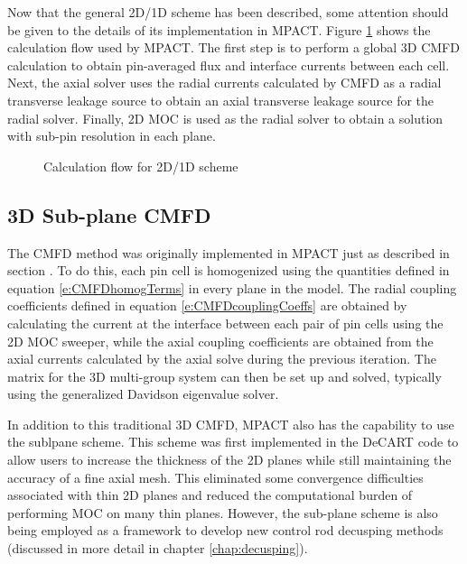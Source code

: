 Now that the general 2D/1D scheme has been described, some attention should be given to the details of its implementation in MPACT.  Figure \ref{f:2d1d-flowchart} shows the calculation flow used by MPACT.  The first step is to perform a global 3D CMFD calculation to obtain pin-averaged flux and interface currents between each cell.  Next, the axial solver uses the radial currents calculated by CMFD as a radial transverse leakage source to obtain an axial transverse leakage source for the radial solver.  Finally, 2D MOC is used as the radial solver to obtain a solution with sub-pin resolution in each plane.

\begin{figure}
\centering

\caption{Calculation flow for 2D/1D scheme}\label{f:2d1d-flowchart}
\end{figure}

\subsection{3D Sub-plane CMFD}

The CMFD method was originally implemented in MPACT just as described in section .  To do this, each pin cell is homogenized using the quantities defined in equation \ref{e:CMFDhomogTerms} in every plane in the model.  The radial coupling coefficients defined in equation \ref{e:CMFDcouplingCoeffs} are obtained by calculating the current at the interface between each pair of pin cells using the 2D MOC sweeper, while the axial coupling coefficients are obtained from the axial currents calculated by the axial solve during the previous iteration.  The matrix for the 3D multi-group system can then be set up and solved, typically using the generalized Davidson eigenvalue solver.

In addition to this traditional 3D CMFD, MPACT also has the capability to use the sublpane scheme.  This scheme was first implemented in the DeCART code to allow users to increase the thickness of the 2D planes while still maintaining the accuracy of a fine axial mesh.  This eliminated some convergence difficulties associated with thin 2D planes  and reduced the computational burden of performing MOC on many thin planes.  However, the sub-plane scheme is also being employed as a framework to develop new control rod decusping methods (discussed in more detail in chapter \ref{chap:decusping}).


